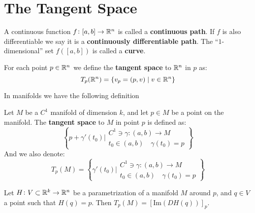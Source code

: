 \documentclass[11pt,a4paper]{article}
\begin{document}
	\section{The Tangent Space}
	\begin{definition}
		A continuous function $f \colon [a,b] \to \mathbb{R}^n$ is called a
		\textbf{continuous path}. If $f$ is also differentiable we say
		it is a \textbf{continuously differentiable path}. The ``$1$-
		dimensional'' set $f([a,b])$ is called a \textbf{curve}.
	\end{definition}
	\begin{definition}
		For each point $p \in \mathbb{R}^n$ we define the \textbf{tangent space}
		to $\mathbb{R}^n$ in $p$ as:
		\[
			T_p(\mathbb{R}^n) = \{v_p = (p,v) \mid v \in \mathbb{R}^n\}
		\]
	\end{definition}
	In manifolds we have the following definition
	\begin{definition}
		Let $M$ be a $C^1$ manifold of dimension $k$, and let $p \in M$ 
		be a point on the manifold. The \textbf{tangent space} to $M$ in 
		point $p$ is defined as:
		\[
			\left\{
				p + \gamma'(t_0) \biggr\vert 
				\substack{
				C^1 \ni \gamma \colon (a,b) \to M \\
				t_0 \in (a,b) \quad \gamma(t_0) = p}
			\right\}
		\]
		And we also denote:
		\[
			T_p(M) = \left\{
				\gamma'(t_0) \biggr\vert 
				\substack{
				C^1 \ni \gamma \colon (a,b) \to M \\
				t_0 \in (a,b) \quad \gamma(t_0) = p}
			\right\}
		\]
	\end{definition}
	\begin{remark}
		Let $H \colon V \subset \mathbb{R}^k \to \mathbb{R}^n$ be a parametrization
		of a manifold $M$ around $p$, and $q \in V$ a point such that
		$H(q) = p$. Then $T_p(M) = [\mathrm{Im}(DH(q))]_p$.
	\end{remark}
\end{document}
